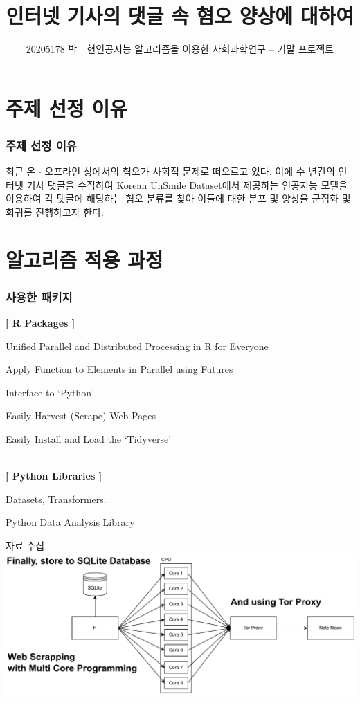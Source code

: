 \documentclass[mathserif, aspectratio=169]{beamer}
\title{인터넷 기사의 댓글 속 혐오 양상에 대하여}
\author{20205178 박~~현\hfill 인공지능 알고리즘을 이용한 사회과학연구 -- 기말 프로젝트}
\institute{}
\date{}
\begin{document}
\frame{\titlepage}

\section{주제 선정 이유}
\begin{frame}
    \frametitle{주제 선정 이유}
    \justifying
    최근 온 $\cdot$ 오프라인 상에서의 혐오가 사회적 문제로 떠오르고 있다.
    이에 수 년간의 인터넷 기사 댓글을 수집하여 Korean UnSmile Dataset에서 제공하는 인공지능 모델을
    이용하여 각 댓글에 해당하는 혐오 분류를 찾아 이들에 대한 분포 및 양상을 군집화 및 회귀를 진행하고자 한다.
\end{frame}
\section{알고리즘 적용 과정}
\begin{frame}
    \frametitle{사용한 패키지}
    \textbf{[ R Packages ]}
    \begin{description}[labelwidth=3cm]
        \item [future:] Unified Parallel and Distributed Processing in R for Everyone
        \item [future.apply:] Apply Function to Elements in Parallel using Futures
        \item [reticulate:]  Interface to `Python'
        \item [rvest:] Easily Harvest (Scrape) Web Pages
        \item [tidyverse:] Easily Install and Load the `Tidyverse'
    \end{description}
    ~\\
    \textbf{[ Python Libraries ]}
    \begin{description}[labelwidth=3cm]
        \item [Hugging Face:] Datasets, Transformers.
        \item [Pandas:] Python Data Analysis Library
    \end{description}
\end{frame}
\begin{frame}{자료 수집}
    \includegraphics[width = \linewidth]{images/data_scrap.pdf}
\end{frame}
\end{document}
